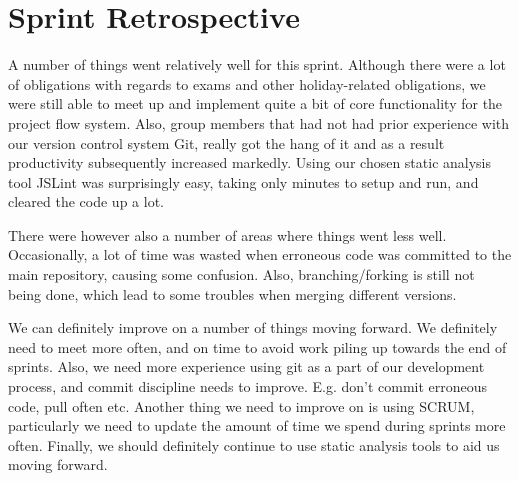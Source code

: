 \section{Sprint Retrospective} %
\label{sec:Sprint Retrospective}

A number of things went relatively well for this sprint. Although there were a lot of obligations with regards to exams and other holiday-related obligations, we were still able to meet up and implement quite a bit of core functionality for the project flow system. Also, group members that had not had prior experience with our version control system Git, really got the hang of it and as a result productivity subsequently increased markedly. Using our chosen static analysis tool JSLint was surprisingly easy, taking only minutes to setup and run, and cleared the code up a lot. 

There were however also a number of areas where things went less well. Occasionally, a lot of time was wasted when erroneous code was committed to the main repository, causing some confusion. Also, branching/forking is still not being done, which lead to some troubles when merging different versions.

We can definitely improve on a number of things moving forward. We definitely need to meet more often, and on time to avoid work piling up towards the end of sprints. Also, we need more experience using git as a part of our development process, and commit discipline needs to improve. E.g. don't commit erroneous code, pull often etc. Another thing we need to improve on is using SCRUM, particularly we need to update the amount of time we spend during sprints more often. Finally, we should definitely continue to use static analysis tools to aid us moving forward. 

